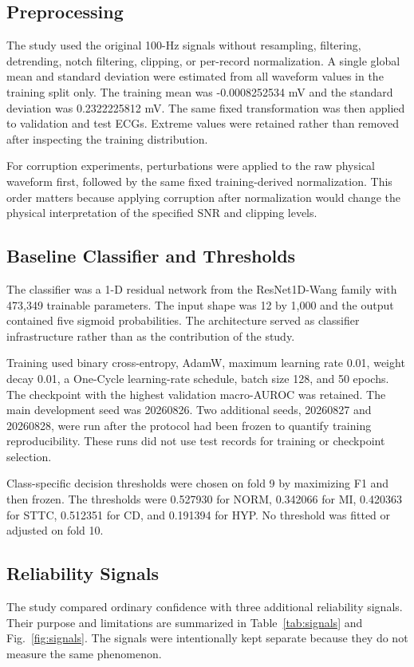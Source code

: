 \documentclass[journal]{IEEEtran}
\newcommand{\TrainMean}{-0.0008252534}
\newcommand{\TrainStd}{0.2322225812}
\begin{document}
\subsection{Preprocessing}
The study used the original 100-Hz signals without resampling, filtering, detrending, notch filtering, clipping, or per-record normalization. A single global mean and standard deviation were estimated from all waveform values in the training split only. The training mean was \TrainMean{} mV and the standard deviation was \TrainStd{} mV. The same fixed transformation was then applied to validation and test ECGs. Extreme values were retained rather than removed after inspecting the training distribution.

For corruption experiments, perturbations were applied to the raw physical waveform first, followed by the same fixed training-derived normalization. This order matters because applying corruption after normalization would change the physical interpretation of the specified SNR and clipping levels.

\subsection{Baseline Classifier and Thresholds}
The classifier was a 1-D residual network from the ResNet1D-Wang family with 473,349 trainable parameters. The input shape was 12 by 1,000 and the output contained five sigmoid probabilities. The architecture served as classifier infrastructure rather than as the contribution of the study.

Training used binary cross-entropy, AdamW, maximum learning rate 0.01, weight decay 0.01, a One-Cycle learning-rate schedule, batch size 128, and 50 epochs. The checkpoint with the highest validation macro-AUROC was retained. The main development seed was 20260826. Two additional seeds, 20260827 and 20260828, were run after the protocol had been frozen to quantify training reproducibility. These runs did not use test records for training or checkpoint selection.

Class-specific decision thresholds were chosen on fold 9 by maximizing F1 and then frozen. The thresholds were 0.527930 for NORM, 0.342066 for MI, 0.420363 for STTC, 0.512351 for CD, and 0.191394 for HYP. No threshold was fitted or adjusted on fold 10.

\subsection{Reliability Signals}
The study compared ordinary confidence with three additional reliability signals. Their purpose and limitations are summarized in Table~\ref{tab:signals} and Fig.~\ref{fig:signals}. The signals were intentionally kept separate because they do not measure the same phenomenon.
\end{document}
